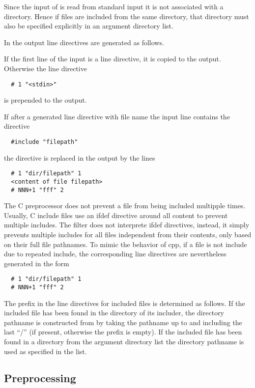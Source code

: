 Since the input of  is read from standard input it is not associated with a directory. Hence
if files are included from the same directory, that directory must also be specified explicitly in an argument directory
list.

In the output line directives are generated as follows.

If the first line of the input is a line directive, it is copied to the output. Otherwise 
the line directive
\begin{verbatim}
  # 1 "<stdin>"
\end{verbatim}
is prepended to the output.

If after a generated line directive with file name  the input line  contains the 
directive 
\begin{verbatim}
  #include "filepath"
\end{verbatim}
the directive is replaced in the output by the lines 
\begin{verbatim}
  # 1 "dir/filepath" 1
  <content of file filepath>
  # NNN+1 "fff" 2
\end{verbatim}

The C preprocessor does not prevent a file from being included multipple times. Usually, C include files use
an ifdef directive around all content to prevent multiple includes. The  filter does
not interprete ifdef directives, instead, it simply prevents multiple includes for all files independent 
from their contents, only based on their full file pathnames. To mimic the behavior of cpp, if a file is 
not include due to repeated include, the corresponding line directives are nevertheless generated in the form
\begin{verbatim}
  # 1 "dir/filepath" 1
  # NNN+1 "fff" 2
\end{verbatim}

The  prefix in the line directives for included files is determined as follows. 
If the included file has been found in the 
directory of its includer, the directory pathname is constructed from  by taking the pathname 
up to and including the last ``/'' (if present, otherwise the prefix is empty).
If the included file has been found in a directory from the argument directory list
the directory pathname is used as specified in the list.

\subsection{Preprocessing}

